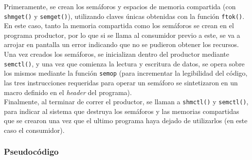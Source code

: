 Primeramente, se crean los semáforos y espacios de memoria compartida (con \texttt{shmget()} y \texttt{semget()}), utilizando claves únicas obtenidas con la función \texttt{ftok()}. En este caso, tanto la memoria compartida como los semáforos se crean en el programa productor, por lo que si se llama al consumidor previo a este, se va a arrojar en pantalla un error indicando que no se pudieron obtener los recursos.\\

Una vez creados los semáforos, se inicializan dentro del productor mediante \texttt{semctl()}, y una vez que comienza la lectura y escritura de datos, se opera sobre los mismos mediante la función \texttt{semop} (para incrementar la legibilidad del código, las tres instrucciones requeridas para operar un semáforo se sintetizaron en un macro definido en el \textit{header} del programa).\\

Finalmente, al terminar de correr el productor, se llaman a \texttt{shmctl()} y \texttt{semctl()}, para indicar al sistema que destruya los semáforos y las memorias compartidas que se crearon una vez que el ultimo programa haya dejado de utilizarlos (en este caso el consumidor).\\

\subsubsection{Pseudocódigo}

